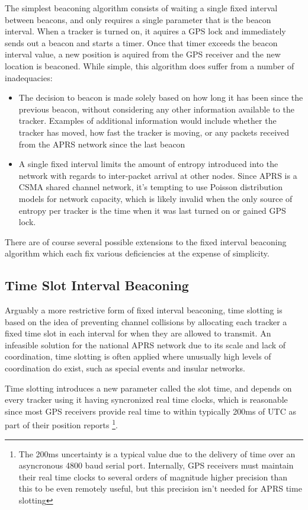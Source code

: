 The simplest beaconing algorithm consists of waiting a single fixed interval
between beacons, and only requires a single parameter that is the beacon interval.
When a tracker is turned on, it aquires a GPS lock and immediately sends out a 
beacon and starts a timer. Once that timer exceeds the beacon interval value, a 
new position is aquired from the GPS receiver and the new location is beaconed.
While simple, this algorithm does suffer from a number of inadequacies:
\begin{itemize}
\item The decision to beacon is made solely based on how long it has been
since the previous beacon, without considering any other information available
to the tracker. Examples of additional information would include whether the 
tracker has moved, how fast the tracker is moving, or any packets received from
the APRS network since the last beacon
\item A single fixed interval limits the amount of entropy introduced into the
network with regards to inter-packet arrival at other nodes. Since APRS is a 
CSMA shared channel network, it's tempting to use Poisson distribution models
for network capacity, which is likely invalid when the only source of entropy 
per tracker is the time when it was last turned on or gained GPS lock.
\end{itemize}

There are of course several possible extensions to the fixed interval beaconing
algorithm which each fix various deficiencies at the expense of simplicity.

\subsection{Time Slot Interval Beaconing}
\label{subsec:timeslot}

Arguably a more restrictive form of fixed interval beaconing, time slotting is 
based on the idea of preventing channel collisions by allocating each tracker
a fixed time slot in each interval for when they are allowed to transmit.
An infeasible solution for the national APRS network due to its scale and lack
of coordination, time slotting is often applied where unusually high levels of
coordination do exist, such as special events and insular networks.

Time slotting introduces a new parameter called the slot time, and depends on every
tracker using it having syncronized real time clocks, which is reasonable since most
GPS receivers provide real time to within typically 200ms of UTC 
as part of their position reports
\footnote{The 200ms uncertainty is a typical value due to the delivery of time over
an asyncronous 4800 baud serial port. Internally, GPS receivers must maintain 
their real time clocks to several orders of magnitude higher precision than this
to be even remotely useful, but this precision isn't needed for APRS time slotting}.

